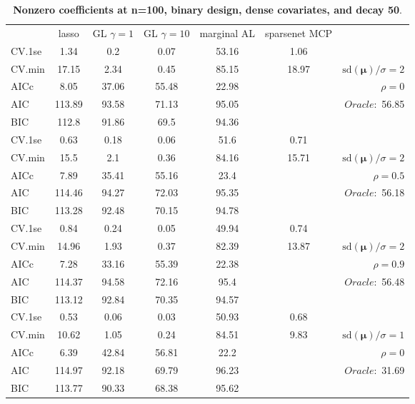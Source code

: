 \clearpage
\begin{table}\vspace{-.5cm}
\caption[l]{ { \bf Nonzero coefficients at n=100, binary design, 
dense covariates, and  decay  50}.}
\vspace{-.5cm}
\footnotesize{}
\begin{center}
\begin{tabular}{l*{5}{c}|r}
& lasso & GL $\gamma=1$ & GL $\gamma=10$ & marginal AL & sparsenet MCP  & \\
 \cline{1-7}
CV.1se & 1.34 & 0.2 & 0.07 & 53.16 & 1.06 & \\
CV.min & 17.15 & 2.34 & 0.45 & 85.15 & 18.97 &  $\mathrm{sd}(\mathbf{\mu})/\sigma=2$ \\
AICc & 8.05 & 37.06 & 55.48 & 22.98 & & $\rho=0$ \\
AIC & 113.89 & 93.58 & 71.13 & 95.05 & &  \multirow{2}{*}{$Oracle: $ 56.85} \\
BIC & 112.8 & 91.86 & 69.5 & 94.36 & &  \\
 \hline 
CV.1se & 0.63 & 0.18 & 0.06 & 51.6 & 0.71 & \\
CV.min & 15.5 & 2.1 & 0.36 & 84.16 & 15.71 &  $\mathrm{sd}(\mathbf{\mu})/\sigma=2$ \\
AICc & 7.89 & 35.41 & 55.16 & 23.4 & & $\rho=0.5$ \\
AIC & 114.46 & 94.27 & 72.03 & 95.35 & &  \multirow{2}{*}{$Oracle: $ 56.18} \\
BIC & 113.28 & 92.48 & 70.15 & 94.78 & &  \\
 \hline 
CV.1se & 0.84 & 0.24 & 0.05 & 49.94 & 0.74 & \\
CV.min & 14.96 & 1.93 & 0.37 & 82.39 & 13.87 &  $\mathrm{sd}(\mathbf{\mu})/\sigma=2$ \\
AICc & 7.28 & 33.16 & 55.39 & 22.38 & & $\rho=0.9$ \\
AIC & 114.37 & 94.58 & 72.16 & 95.4 & &  \multirow{2}{*}{$Oracle: $ 56.48} \\
BIC & 113.12 & 92.84 & 70.35 & 94.57 & &  \\
 \hline 
CV.1se & 0.53 & 0.06 & 0.03 & 50.93 & 0.68 & \\
CV.min & 10.62 & 1.05 & 0.24 & 84.51 & 9.83 &  $\mathrm{sd}(\mathbf{\mu})/\sigma=1$ \\
AICc & 6.39 & 42.84 & 56.81 & 22.2 & & $\rho=0$ \\
AIC & 114.97 & 92.18 & 69.79 & 96.23 & &  \multirow{2}{*}{$Oracle: $ 31.69} \\
BIC & 113.77 & 90.33 & 68.38 & 95.62 & &  \\

\end{tabular}
\end{center}
\end{table}
